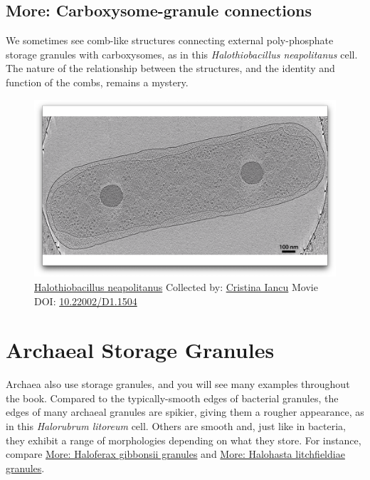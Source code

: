 \documentclass[]{tufte-book}
\begin{document}
\hypertarget{Carboxysome-granule_connections}{\subsection*{More:
Carboxysome-granule connections}\label{Carboxysome-granule_connections}}

We sometimes see comb-like structures connecting external poly-phosphate
storage granules with carboxysomes, as in this \emph{Halothiobacillus
neapolitanus} cell. The nature of the relationship between the
structures, and the identity and function of the combs, remains a
mystery.





\begin{figure}
\includegraphics{movie_stills/4_9b} \caption[\protect\hyperlink{tree}{Halothiobacillus neapolitanus}
Collected by: \protect\hyperlink{cristina_iancu}{Cristina Iancu} Movie
DOI: \href{https://doi.org/10.22002/D1.1504}{10.22002/D1.1504}]{\protect\hyperlink{tree}{Halothiobacillus neapolitanus}
Collected by: \protect\hyperlink{cristina_iancu}{Cristina Iancu} Movie
DOI: \href{https://doi.org/10.22002/D1.1504}{10.22002/D1.1504}}\label{fig:4-9b}
\end{figure}

\section{Archaeal Storage Granules}\label{archaeal-storage-granules}

Archaea also use storage granules, and you will see many examples
throughout the book. Compared to the typically-smooth edges of bacterial
granules, the edges of many archaeal granules are spikier, giving them a
rougher appearance, as in this \emph{Halorubrum litoreum} cell. Others
are smooth and, just like in bacteria, they exhibit a range of
morphologies depending on what they store. For instance, compare
\protect\hyperlink{Haloferax_gibbonsii_granules}{More: Haloferax
gibbonsii granules} and
\protect\hyperlink{Halohasta_litchfieldiae_granules}{More: Halohasta
litchfieldiae granules}.
\end{document}
